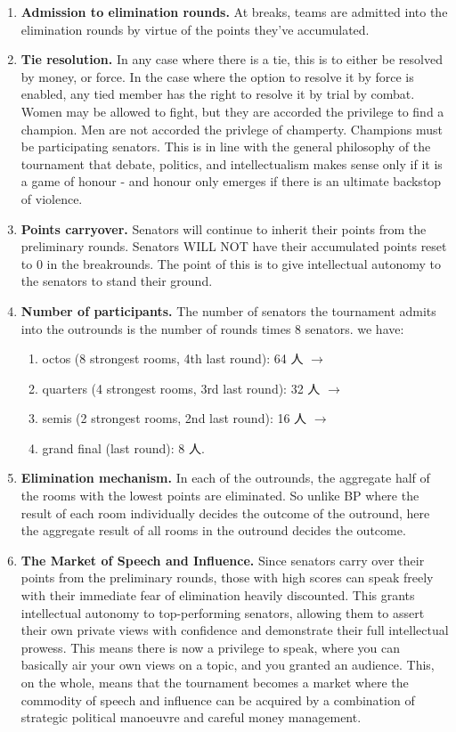 \begin{enumerate}
    \item \textbf{Admission to elimination rounds.} At breaks, teams are admitted into the elimination rounds by virtue of the points they've accumulated. 
    \item \textbf{Tie resolution.} In any case where there is a tie, this is to either be resolved by money, or force. In the case where the option to resolve it by force is enabled, any tied member has the right to resolve it by trial by combat. Women may be allowed to fight, but they are accorded the privilege to find a champion. Men are not accorded the privlege of champerty. Champions must be participating senators. This is in line with the general philosophy of the tournament that debate, politics, and intellectualism makes sense only if it is a game of honour - and honour only emerges if there is an ultimate backstop of violence.
    \item \textbf{Points carryover.} Senators will continue to inherit their points from the preliminary rounds. Senators WILL NOT have their accumulated points reset to 0 in the breakrounds. The point of this is to give intellectual autonomy to the senators to stand their ground. 


    \item \textbf{Number of participants.} The number of senators the tournament admits into the outrounds is the number of rounds times 8 senators. we have: 
        \begin{enumerate}
            \item octos (8 strongest rooms, 4th last round): 64 人 $\rightarrow$
            \item quarters (4 strongest rooms, 3rd last round): 32 人 $\rightarrow$ 
            \item semis (2 strongest rooms, 2nd last round): 16 人 $\rightarrow$ 
            \item grand final (last round): 8 人.
        \end{enumerate}
    
    \item \textbf{Elimination mechanism.} In each of the outrounds, the aggregate half of the rooms with the lowest points are eliminated. So unlike BP where the result of each room individually decides the outcome of the outround, here the aggregate result of all rooms in the outround decides the outcome.
    
    
    \item \textbf{The Market of Speech and Influence.} Since senators carry over their points from the preliminary rounds, those with high scores can speak freely with their immediate fear of elimination heavily discounted. This grants intellectual autonomy to top-performing senators, allowing them to assert their own private views with confidence and demonstrate their full intellectual prowess. This means there is now a privilege to speak, where you can basically air your own views on a topic, and you granted an audience. This, on the whole, means that the tournament becomes a market where the commodity of speech and influence can be acquired by a combination of strategic political manoeuvre and careful money management.
    

\end{enumerate}
